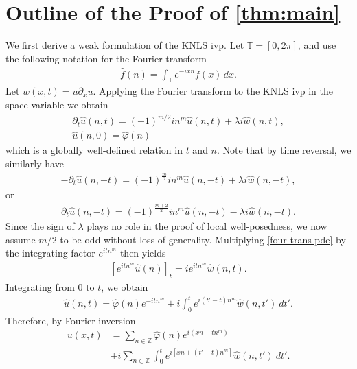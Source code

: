 \documentclass[12pt,reqno]{amsart}
\numberwithin{equation}{section}  %
\numberwithin{figure}{section}
\newcommand{\zz}{\mathbb{Z}}
\newcommand{\ci}{\mathbb{T}}
\newcommand{\wh}{\widehat}
\newcommand{\p}{\partial}
\newcommand{\vp}{\varphi}
\theoremstyle{plain}
\theoremstyle{definition}
\theoremstyle{remark}
\begin{document}
\section{Outline of the Proof of \autoref{thm:main}}
%
%
%
%
%
We first derive a weak formulation of the KNLS ivp. 
Let $\ci = [0, 2 \pi]$, and use
the following notation for the Fourier transform
%
%
%
%
\begin{equation}
	\label{four-trans-pde}
	\begin{split}
		\widehat{f}(n) = \int_{\ci} e^{-ix n} f(x) \, dx.
	\end{split}
\end{equation}
Let $w(x,t) = u \p_x u$. Applying 
the Fourier transform to the KNLS ivp in the space variable we obtain 
%
%
\begin{gather*}
	\p_t \widehat{u}(n, t) = (-1)^{m/2}i n^m \widehat{u}(n, t) + \lambda i  
	\widehat{w} (n, t),
	\\
	\widehat{u} (n,0) = \widehat{\vp}(n)
\end{gather*}
%
%
which is a globally well-defined relation in $t$ 
and $n$. Note that by time reversal, we similarly have 
\begin{gather*}
	-\p_t \widehat{u}(n, -t) = (-1)^{\frac{m}{2}}i n^m \widehat{u}(n, -t) + \lambda i  
	\widehat{w} (n, -t),
\end{gather*}
or
\begin{gather*}
	\p_t \widehat{u}(n, -t) = (-1)^{\frac{m+2}{2}}i n^m \widehat{u}(n, -t) - \lambda i  
	\widehat{w} (n, -t).
\end{gather*}
Since the sign of $\lambda$ plays no role in the proof of local well-posedness,
we now assume $m/2$ to be odd without loss of generality. 
Multiplying \eqref{four-trans-pde} by the integrating factor $e^{itn^m}$ then yields
\begin{equation*}
	\begin{split}
		\left[ e^{ it n^m} \widehat{u}(n) \right]_t = i
		 e^{ it n^m} \widehat{w} (n, t).	
	\end{split}
\end{equation*}
%
%
Integrating from $0$ to $t$, we obtain
%
%
\begin{equation*}
	\begin{split}
		\wh{u}(n, t) = \wh{\vp}(n) e^{- it n^m} + i  
		\int_0^t e^{ i(t' - t) n^m} \wh{w}(n, t') \ 
		dt'.
	\end{split}
\end{equation*}
%
%
Therefore, by Fourier inversion 
%
%
\begin{equation}
	\label{KNLS-integral-form}
	\begin{split}
		u(x,t) & = \sum_{n \in \zz} \wh{\vp}(n) e^{i\left( xn - t n^m 
		\right)} 
		\\
		& + i \sum_{n \in \zz} \int_0^t e^{i\left[ xn + \left( t' - t 
		\right) n^m \right]} \wh{w}(n, t') \ dt'.
	\end{split}
\end{equation}
\end{document}
